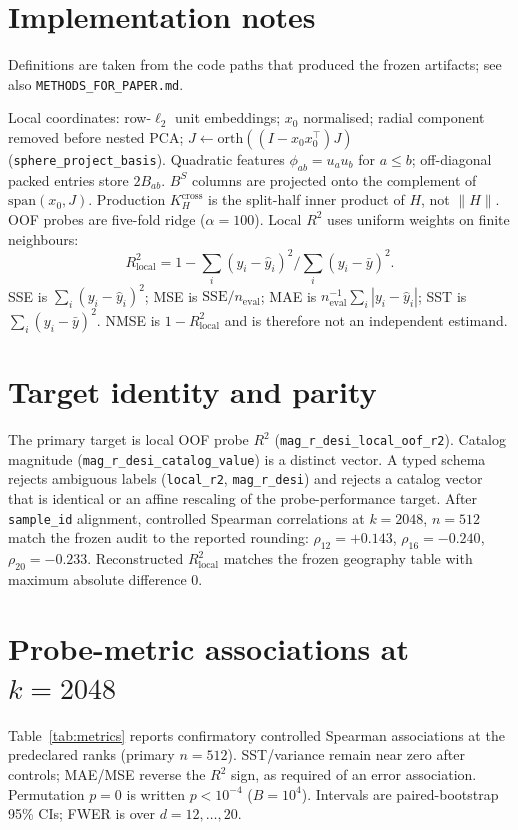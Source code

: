 \section{Implementation notes}
\label{app:methods}

Definitions are taken from the code paths that produced the frozen artifacts; see also \texttt{METHODS\_FOR\_PAPER.md}.

Local coordinates: row-$\ell_2$ unit embeddings; $x_0$ normalised; radial component removed before nested PCA; $J\leftarrow\mathrm{orth}((I-x_0x_0^\top)J)$ (\texttt{sphere\_project\_basis}). Quadratic features $\phi_{ab}=u_au_b$ for $a\le b$; off-diagonal packed entries store $2B_{ab}$. $B^S$ columns are projected onto the complement of $\mathrm{span}(x_0,J)$. Production $K_H^{\mathrm{cross}}$ is the split-half inner product of $H$, not $\|H\|$. OOF probes are five-fold ridge ($\alpha{=}100$). Local $R^2$ uses uniform weights on finite neighbours:
\[
R^{2}_{\mathrm{local}}=1-\sum_i(y_i-\hat y_i)^2\Big/\sum_i(y_i-\bar y)^2.
\]
SSE is $\sum_i(y_i-\hat y_i)^2$; MSE is $\mathrm{SSE}/n_{\mathrm{eval}}$; MAE is $n_{\mathrm{eval}}^{-1}\sum_i|y_i-\hat y_i|$; SST is $\sum_i(y_i-\bar y)^2$. NMSE is $1-R^{2}_{\mathrm{local}}$ and is therefore not an independent estimand.

\section{Target identity and parity}
\label{app:parity}

The primary target is local OOF probe $R^{2}$ (\texttt{mag\_r\_desi\_local\_oof\_r2}). Catalog magnitude (\texttt{mag\_r\_desi\_catalog\_value}) is a distinct vector. A typed schema rejects ambiguous labels (\texttt{local\_r2}, \texttt{mag\_r\_desi}) and rejects a catalog vector that is identical or an affine rescaling of the probe-performance target. After \texttt{sample\_id} alignment, controlled Spearman correlations at $k{=}2048$, $n{=}512$ match the frozen audit to the reported rounding: $\rho_{12}{=}+0.143$, $\rho_{16}{=}-0.240$, $\rho_{20}{=}-0.233$. Reconstructed $R^{2}_{\mathrm{local}}$ matches the frozen geography table with maximum absolute difference $0$.

\section{Probe-metric associations at $k{=}2048$}
\label{app:metrics}

Table~\ref{tab:metrics} reports confirmatory controlled Spearman associations at the predeclared ranks (primary $n{=}512$). SST/variance remain near zero after controls; MAE/MSE reverse the $R^2$ sign, as required of an error association. Permutation $p{=}0$ is written $p{<}10^{-4}$ ($B{=}10^{4}$). Intervals are paired-bootstrap 95\% CIs; FWER is over $d{=}12,\ldots,20$.

